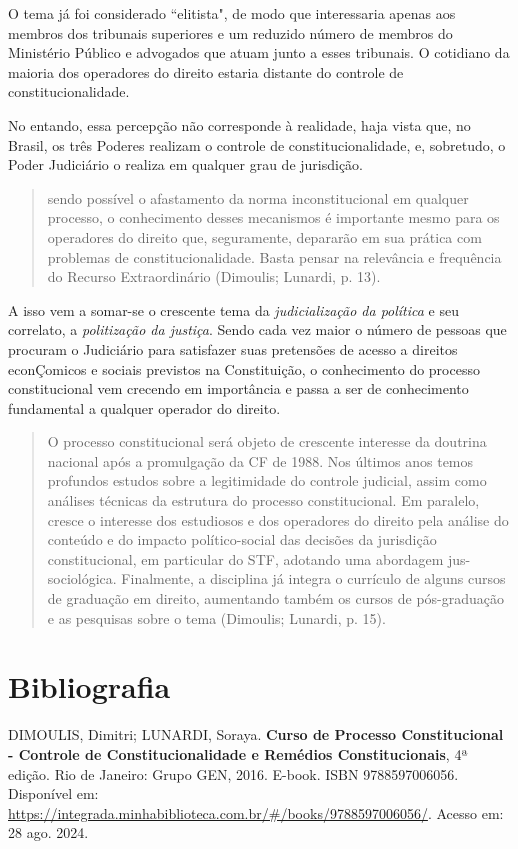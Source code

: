 \documentclass{article}
\begin{document}
O tema já foi considerado ``elitista", de modo que interessaria apenas aos membros dos tribunais superiores e um reduzido número de membros do Ministério Público e advogados que atuam junto a esses tribunais. O cotidiano da maioria dos operadores do direito estaria distante do controle de constitucionalidade.

No entando, essa percepção não corresponde à realidade, haja vista que, no Brasil, os três Poderes realizam o controle de constitucionalidade, e, sobretudo, o Poder Judiciário o realiza em qualquer grau de jurisdição. 

\begin{quote}
    sendo possível o afastamento da norma inconstitucional em qualquer processo, o conhecimento desses mecanismos é importante mesmo para os operadores do direito que, seguramente, depararão em sua prática com problemas de constitucionalidade. Basta pensar na relevância e frequência do Recurso Extraordinário (Dimoulis; Lunardi, p. 13).
\end{quote}

A isso vem a somar-se o crescente tema da \textit{judicialização da política} e seu correlato, a \textit{politização da justiça}. Sendo cada vez maior o número de pessoas que procuram o Judiciário para satisfazer suas pretensões de acesso a direitos econÇomicos e sociais previstos na Constituição, o conhecimento do processo constitucional vem crecendo em importância e passa a ser de conhecimento fundamental a qualquer operador do direito.

\begin{quote}
    O processo constitucional será objeto de crescente interesse da doutrina nacional após a promulgação da CF de 1988. Nos últimos anos temos profundos estudos sobre a legitimidade do controle judicial, assim como análises técnicas da estrutura do processo constitucional. Em paralelo, cresce o interesse dos estudiosos e dos operadores do direito pela análise do conteúdo e do impacto político-social das decisões da jurisdição constitucional, em particular do STF, adotando uma abordagem jus-sociológica. Finalmente, a disciplina já integra o currículo de alguns cursos de graduação em direito, aumentando também os cursos de pós-graduação e as pesquisas sobre o tema (Dimoulis; Lunardi, p. 15).
\end{quote}

\section{Bibliografia}

DIMOULIS, Dimitri; LUNARDI, Soraya. \textbf{Curso de Processo Constitucional - Controle de Constitucionalidade e Remédios Constitucionais}, 4ª edição. Rio de Janeiro: Grupo GEN, 2016. E-book. ISBN 9788597006056. Disponível em: \href{https://integrada.minhabiblioteca.com.br/#/books/9788597006056/}{https://integrada.minhabiblioteca.com.br/#/books/9788597006056/}. Acesso em: 28 ago. 2024.
\end{document}
